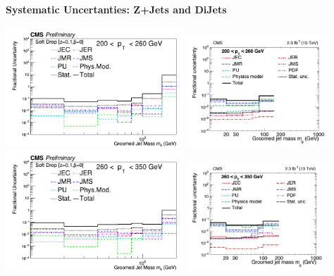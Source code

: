 \documentclass{beamer}
\begin{document}
\begin{frame}{\textbf{Systematic Uncertanties: Z+Jets and DiJets}}

\vspace{.5mm}
\includegraphics[width=0.5\textwidth]{Oct31_unfoldPlots_sdB0/AllSystematics_FractionofUnfoldedBinContent_ptbin2MC_mass_Ptbin200to260_Detbinning_Groomingis_sdB0.png}%
\includegraphics[width=0.4\textwidth]{dijet200.png}
\newline
\includegraphics[width=0.5\textwidth]{Oct31_unfoldPlots_sdB0/AllSystematics_FractionofUnfoldedBinContent_ptbin3MC_mass_Ptbin260to350_Detbinning_Groomingis_sdB0.png}%
\includegraphics[width=0.4\textwidth]{dijet260.png}


\end{frame}
\end{document}
